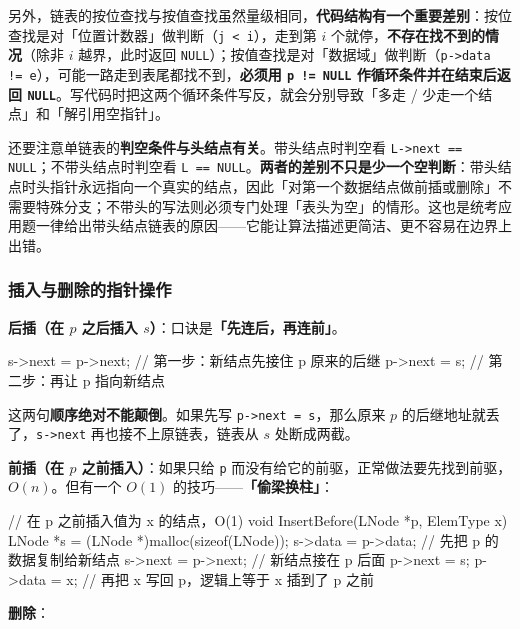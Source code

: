 \documentclass[11pt,openany,UTF8]{ctexbook}
\begin{document}
另外，链表的按位查找与按值查找虽然量级相同，\textbf{代码结构有一个重要差别}：按位查找是对「位置计数器」做判断（\texttt{j <\allowbreak{} i}），走到第 $i$ 个就停，\textbf{不存在找不到的情况}（除非 $i$ 越界，此时返回 \texttt{NULL}）；按值查找是对「数据域」做判断（\texttt{p->\allowbreak{}data !=\allowbreak{} e}），可能一路走到表尾都找不到，\textbf{必须用 \texttt{p !=\allowbreak{} NULL} 作循环条件并在结束后返回 \texttt{NULL}}。写代码时把这两个循环条件写反，就会分别导致「多走 / 少走一个结点」和「解引用空指针」。

还要注意单链表的\textbf{判空条件与头结点有关}。带头结点时判空看 \texttt{L->\allowbreak{}next =\allowbreak{}=\allowbreak{} NULL}；不带头结点时判空看 \texttt{L =\allowbreak{}=\allowbreak{} NULL}。\textbf{两者的差别不只是少一个空判断}：带头结点时头指针永远指向一个真实的结点，因此「对第一个数据结点做前插或删除」不需要特殊分支；不带头的写法则必须专门处理「表头为空」的情形。这也是统考应用题一律给出带头结点链表的原因——它能让算法描述更简洁、更不容易在边界上出错。

\subsubsection{插入与删除的指针操作}

\textbf{后插（在 $p$ 之后插入 $s$）}：口诀是\textbf{「先连后，再连前」}。

\begin{codebox}
s->next = p->next;   // 第一步：新结点先接住 p 原来的后继
p->next = s;         // 第二步：再让 p 指向新结点
\end{codebox}

这两句\textbf{顺序绝对不能颠倒}。如果先写 \texttt{p->\allowbreak{}next =\allowbreak{} s}，那么原来 $p$ 的后继地址就丢了，\texttt{s->\allowbreak{}next} 再也接不上原链表，链表从 $s$ 处断成两截。

\textbf{前插（在 $p$ 之前插入）}：如果只给 \texttt{p} 而没有给它的前驱，正常做法要先找到前驱，$O(n)$。但有一个 $O(1)$ 的技巧——\textbf{「偷梁换柱」}：

\begin{codebox}
// 在 p 之前插入值为 x 的结点，O(1)
void InsertBefore(LNode *p, ElemType x) {
    LNode *s = (LNode *)malloc(sizeof(LNode));
    s->data = p->data;   // 先把 p 的数据复制给新结点
    s->next = p->next;   // 新结点接在 p 后面
    p->next = s;
    p->data = x;         // 再把 x 写回 p，逻辑上等于 x 插到了 p 之前
}
\end{codebox}

\textbf{删除}：
\end{document}
